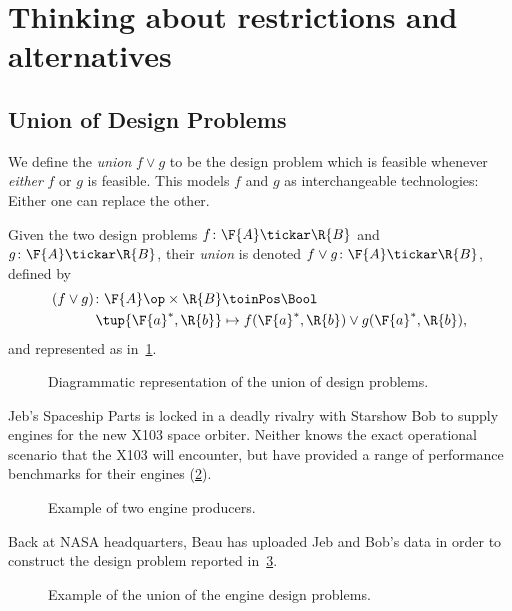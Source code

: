 \section{Thinking about restrictions and alternatives}
\subsection{Union of Design Problems}

We define the \emph{union} $f \vee g$ to be the design problem which is feasible whenever \emph{either} $f$ or $g$ is feasible. This models $f$ and $g$ as interchangeable technologies: Either one can replace the other.

\begin{definition}
Given the two design problems $f \colon \F{A} \tickar \R{B}$ and $g \colon \F{A} \tickar \R{B}$, their \emph{union} is denoted $f \vee g \colon \F{A} \tickar \R{B}$, defined by
\begin{equation}
\begin{aligned}
(f \vee g)\colon \F{A}\op \times \R{B} & \toinPos \Bool \\
\tup{\F{a}^*, \R{b}} & \mapsto f(\F{a}^*, \R{b}) \vee g(\F{a}^*, \R{b}),
\end{aligned}
\end{equation}
and represented as in~\cref{fig:uniondp}.
\begin{figure}[h!]
\begin{center}
\end{center}
\caption{Diagrammatic representation of the union of design problems. \label{fig:uniondp}}
\end{figure}
\end{definition}

\begin{example}
Jeb's Spaceship Parts is locked in a deadly rivalry with Starshow Bob to supply engines for the new X103 space orbiter. Neither knows the exact operational scenario that the X103 will encounter, but have provided a range of performance benchmarks for their engines (\cref{fig:exunion_1}).
\begin{figure}[h!]
\begin{center}
\end{center}
\caption{Example of two engine producers. \label{fig:exunion_1}}
\end{figure}
Back at NASA headquarters, Beau has uploaded Jeb and Bob's data in order to construct the design problem reported in~\cref{fig:exunion_2}.
\begin{figure}[h!]
\begin{center}
\end{center}
\caption{Example of the union of the engine design problems. \label{fig:exunion_2}}
\end{figure}
\end{example}

